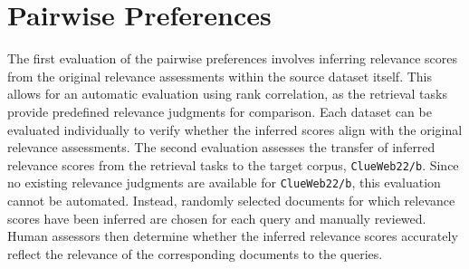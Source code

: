 \begin{table}[t]
{\begin{tabular}{ccccccccccccccc}
        \bottomrule 
    \end{tabular}}
    \renewcommand{\arraystretch}{1.0}
\end{table}


\section{Pairwise Preferences}\label{eval-pairwise-preferences}

The first evaluation of the pairwise preferences involves inferring relevance scores from the original relevance assessments within the source dataset itself. This allows for an automatic evaluation using rank correlation, as the retrieval tasks provide predefined relevance judgments for comparison. Each dataset can be evaluated individually to verify whether the inferred scores align with the original relevance assessments. The second evaluation assesses the transfer of inferred relevance scores from the retrieval tasks to the target corpus, \texttt{ClueWeb22/b}. Since no existing relevance judgments are available for \texttt{ClueWeb22/b}, this evaluation cannot be automated. Instead, randomly selected documents for which relevance scores have been inferred are chosen for each query and manually reviewed. Human assessors then determine whether the inferred relevance scores accurately reflect the relevance of the corresponding documents to the queries.

